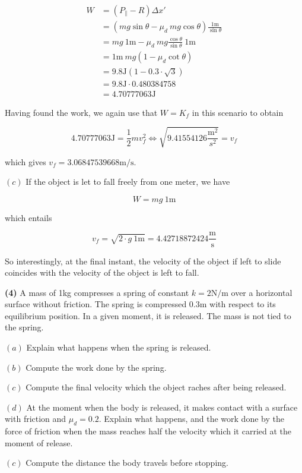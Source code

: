 \documentclass[12pt]{article}
\theoremstyle{definition}
\begin{document}
\begin{align*}
    W &= ( P_\parallel - R)\Delta x' \\
    &= \left( mg \sin \theta - \mu_d ~ mg \cos
    \theta \right) \frac{1\text{m}}{\sin \theta}\\ 
    &=mg ~ \text{1m} - \mu_d ~ mg \frac{\cos \theta}{\sin \theta} ~ \text{1m} \\ 
    &= 1\text{m} ~ mg \left( 1 - \mu_d \cot \theta \right)  \\ 
    &= 9.8\text{J}\left( 1 - 0.3 \cdot \sqrt{3}  \right)  \\ 
    &= 9.8\text{J} \cdot 0.480384758 \\ 
    &= 4.70777063\text{J}
\end{align*}

Having found the work, we again use that $W = K_f$ in this scenario to obtain 

\begin{equation}
    4.70777063\text{J} = \frac{1}{2}mv_f^2 \iff\sqrt{9.41554126
    \frac{\text{m}^2}{s^2}} = v_f 
\end{equation}

which gives $v_f = 3.06847539668 \text{m/s}$.

$(c)$ If the object is let to fall freely from one meter, we have 

\begin{equation*}
    W = mg ~ \text{1m}
\end{equation*}

which entails 

\begin{equation*}
    v_f = \sqrt{2 \cdot g ~ 1 \text{m}} = 4.42718872424 \frac{\text{m}}{\text{s}}
\end{equation*}

So interestingly, at the final instant, the velocity of the object if left to
slide coincides with the velocity of the object is left to fall.

\pagebreak 

\begin{shaded}
    \textbf{(4)} A mass of 1kg compresses a spring of constant $k = 2
    \text{N/m}$ over a horizontal surface without friction. The spring is
    compressed 0.3m with respect to its equilibrium position. In a given moment,
    it is released. The mass is not tied to the spring.

    $(a)$ Explain what happens when the spring is released. 

    $(b)$ Compute the work done by the spring. 

    $(c)$ Compute the final velocity which the object raches after being
    released. 

    $(d)$ At the moment when the body is released, it makes contact with a
    surface with friction and $\mu_d = 0.2$. Explain what happens, and the work
    done by the force of friction when the mass reaches half the velocity which
    it carried at the moment of release. 

    $(c)$ Compute the distance the body travels before stopping.
\end{shaded}
\end{document}
